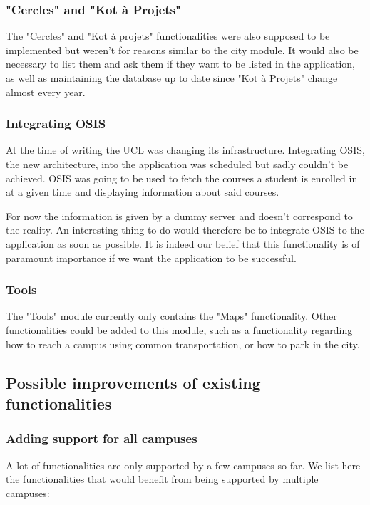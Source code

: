 \documentclass[11pt, a4paper]{report}
\begin{document}
\subsubsection{"Cercles" and "Kot à Projets"}

The "Cercles" and "Kot à projets" functionalities were also supposed to be implemented but weren't for reasons similar to the city module. It would also be necessary to list them and ask them if they want to be listed in the application, as well as maintaining the database up to date since "Kot à Projets" change almost every year.

\subsubsection{Integrating OSIS}

At the time  of writing the UCL was changing its infrastructure. Integrating OSIS, the new architecture, into the application was scheduled but sadly couldn't be achieved. OSIS was going to be used to fetch the courses a student is enrolled in at a given time and displaying information about said courses. 

For now the information is given by a dummy server and doesn't correspond to the reality. An interesting thing to do would therefore be to integrate OSIS to the application as soon as possible.  It is indeed our belief that this functionality is of paramount importance if we want the application to be successful. 

\subsubsection{Tools}

The "Tools" module currently only contains the "Maps" functionality. Other functionalities could be added to this module, such as a functionality regarding how to reach a campus using common transportation, or how to park in the city.

\subsection{Possible improvements of existing functionalities}

\subsubsection{Adding support for all campuses}

A lot of functionalities are only supported by a few campuses so far. We list here the functionalities that would benefit from being supported by multiple campuses:
\end{document}
